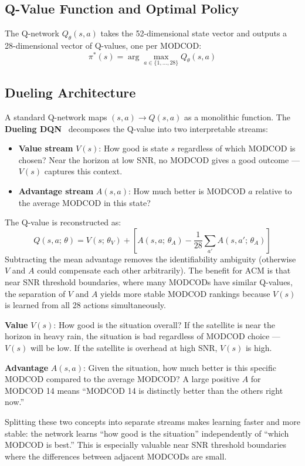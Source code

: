 \documentclass[12pt,a4paper]{report}
\begin{document}
\subsection{Q-Value Function and Optimal Policy}

The Q-network $Q_\theta(s, a)$ takes the 52-dimensional state vector and
outputs a 28-dimensional vector of Q-values, one per MODCOD:
\begin{equation}
    \pi^*(s) = \arg\max_{a \in \{1,\ldots,28\}} Q_\theta(s, a)
\end{equation}

\subsection{Dueling Architecture}

A standard Q-network maps $(s, a) \to Q(s,a)$ as a monolithic function.
The \textbf{Dueling DQN}~\cite{wang2016dueling} decomposes the Q-value into two
interpretable streams:
\begin{itemize}
    \item \textbf{Value stream} $V(s)$: How good is state $s$ regardless of
          which MODCOD is chosen? Near the horizon at low SNR, no MODCOD
          gives a good outcome --- $V(s)$ captures this context.
    \item \textbf{Advantage stream} $A(s, a)$: How much better is MODCOD $a$
          relative to the average MODCOD in this state?
\end{itemize}
The Q-value is reconstructed as:
\begin{equation}
    Q(s, a;\,\theta) = V(s;\,\theta_V) + \left[
        A(s, a;\,\theta_A) - \frac{1}{28}\sum_{a'} A(s, a';\,\theta_A)
    \right]
\end{equation}
Subtracting the mean advantage removes the identifiability ambiguity
(otherwise $V$ and $A$ could compensate each other arbitrarily). The benefit
for ACM is that near SNR threshold boundaries, where many MODCODs have
similar Q-values, the separation of $V$ and $A$ yields more stable MODCOD
rankings because $V(s)$ is learned from all 28 actions simultaneously.

\begin{plainenglish}
\textbf{Value} $V(s)$: How good is the situation overall?  If the satellite is
near the horizon in heavy rain, the situation is bad regardless of MODCOD choice
--- $V(s)$ will be low.  If the satellite is overhead at high SNR, $V(s)$ is high.

\textbf{Advantage} $A(s,a)$: Given the situation, how much better is this specific
MODCOD compared to the average MODCOD?  A large positive $A$ for MODCOD 14 means
``MODCOD 14 is distinctly better than the others right now.''

Splitting these two concepts into separate streams makes learning faster and more
stable: the network learns ``how good is the situation'' independently of ``which
MODCOD is best.''  This is especially valuable near SNR threshold boundaries where
the differences between adjacent MODCODs are small.
\end{plainenglish}
\end{document}
